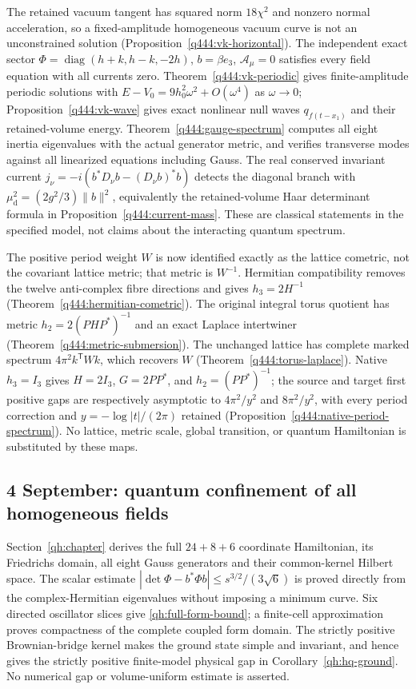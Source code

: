 The retained vacuum tangent has squared norm $18\chi^2$ and nonzero
normal acceleration, so a fixed-amplitude homogeneous vacuum curve is not
an unconstrained solution (Proposition~\ref{q444:vk-horizontal}). The
independent exact sector
$\Phi=\operatorname{diag}(h+k,h-k,-2h)$, $b=\beta e_3$,
$\mathcal A_\mu=0$ satisfies every field equation with all currents zero.
Theorem~\ref{q444:vk-periodic} gives finite-amplitude periodic solutions
with $E-V_0=9h_0^2\omega^2+O(\omega^4)$ as $\omega\to0$;
Proposition~\ref{q444:vk-wave} gives exact nonlinear null waves
$q_{f(t-x_1)}$ and their retained-volume energy. Theorem~\ref{q444:gauge-spectrum}
computes all eight inertia eigenvalues with the actual generator metric,
and verifies transverse modes against all linearized equations including
Gauss. The real conserved invariant current
$j_\nu=-i(b^*D_\nu b-(D_\nu b)^*b)$ detects the diagonal branch with
$\mu_{\mathrm d}^2=(2g^2/3)\|b\|^2$, equivalently the retained-volume
Haar determinant formula in Proposition~\ref{q444:current-mass}.
These are classical statements in the specified model, not claims about
the interacting quantum spectrum.

The positive period weight $W$ is now identified exactly as the lattice
cometric, not the covariant lattice metric; that metric is $W^{-1}$.
Hermitian compatibility removes the twelve anti-complex fibre directions
and gives $h_3=2H^{-1}$ (Theorem~\ref{q444:hermitian-cometric}).
The original integral torus quotient has metric
$h_2=2(PHP^*)^{-1}$ and an exact Laplace intertwiner
(Theorem~\ref{q444:metric-submersion}). The unchanged lattice has complete
marked spectrum $4\pi^2k^{\mathsf T}Wk$, which recovers $W$
(Theorem~\ref{q444:torus-laplace}). Native $h_3=I_3$ gives $H=2I_3$,
$G=2PP^*$, and $h_2=(PP^*)^{-1}$; the source and target first positive
gaps are respectively asymptotic to $4\pi^2/y^2$ and $8\pi^2/y^2$,
with every period correction and $y=-\log|t|/(2\pi)$ retained
(Proposition~\ref{q444:native-period-spectrum}). No lattice, metric scale,
global transition, or quantum Hamiltonian is substituted by these maps.

\subsection*{4 September: quantum confinement of all homogeneous fields}
Section~\ref{qh:chapter} derives the full $24+8+6$ coordinate
Hamiltonian, its Friedrichs domain, all eight Gauss generators and
their common-kernel Hilbert space. The scalar estimate
$|\det\Phi-b^*\Phi b|\leq s^{3/2}/(3\sqrt6)$ is proved directly
from the complex-Hermitian eigenvalues without imposing a minimum
curve. Six directed oscillator slices give
\eqref{qh:full-form-bound}; a finite-cell approximation proves
compactness of the complete coupled form domain. The strictly
positive Brownian-bridge kernel makes the ground state simple and
invariant, and hence gives the strictly positive finite-model
physical gap in Corollary~\ref{qh:hq-ground}.
No numerical gap or volume-uniform estimate is asserted.


